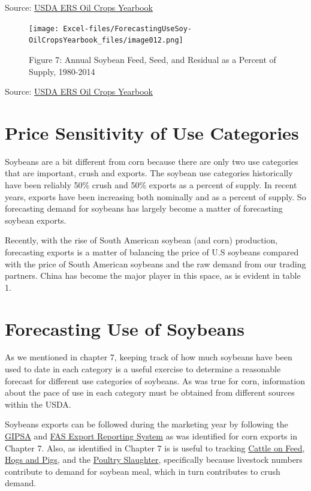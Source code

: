 \documentclass[
  letterpaper,
  DIV=11,
  numbers=noendperiod]{scrreprt}
\begin{document}
Source:
\href{http://www.ers.usda.gov/data-products/oil-crops-yearbook.aspx}{USDA
ERS Oil Crops Yearbook}

\begin{figure}[H]

{\centering \texttt{[image: Excel-files/ForecastingUseSoy-OilCropsYearbook\_files/image012.png]}

}

\caption{Figure 7: Annual Soybean Feed, Seed, and Residual as a Percent
of Supply, 1980-2014}

\end{figure}%

Source:
\href{http://www.ers.usda.gov/data-products/oil-crops-yearbook.aspx}{USDA
ERS Oil Crops Yearbook}

\section{Price Sensitivity of Use
Categories}\label{price-sensitivity-of-use-categories-1}

Soybeans are a bit different from corn because there are only two use
categories that are important, crush and exports. The soybean use
categories historically have been reliably 50\% crush and 50\% exports
as a percent of supply. In recent years, exports have been increasing
both nominally and as a percent of supply. So forecasting demand for
soybeans has largely become a matter of forecasting soybean exports.

Recently, with the rise of South American soybean (and corn) production,
forecasting exports is a matter of balancing the price of U.S soybeans
compared with the price of South American soybeans and the raw demand
from our trading partners. China has become the major player in this
space, as is evident in table 1.

\section{Forecasting Use of
Soybeans}\label{forecasting-use-of-soybeans-1}

As we mentioned in chapter 7, keeping track of how much soybeans have
been used to date in each category is a useful exercise to determine a
reasonable forecast for different use categories of soybeans. As was
true for corn, information about the pace of use in each category must
be obtained from different sources within the USDA.

Soybeans exports can be followed during the marketing year by following
the \href{}{GIPSA} and \href{}{FAS Export Reporting System} as was
identified for corn exports in Chapter 7. Also, as identified in Chapter
7 is is useful to tracking
\href{http://usda.mannlib.cornell.edu/MannUsda/viewDocumentInfo.do?documentID=1020}{Cattle
on Feed},
\href{http://usda.mannlib.cornell.edu/MannUsda/viewDocumentInfo.do?documentID=1086}{Hogs
and Pigs}, and the
\href{https://usda.mannlib.cornell.edu/MannUsda/viewDocumentInfo.do?documentID=1131}{Poultry
Slaughter}, specifically because livestock numbers contribute to demand
for soybean meal, which in turn contributes to crush demand.
\end{document}
